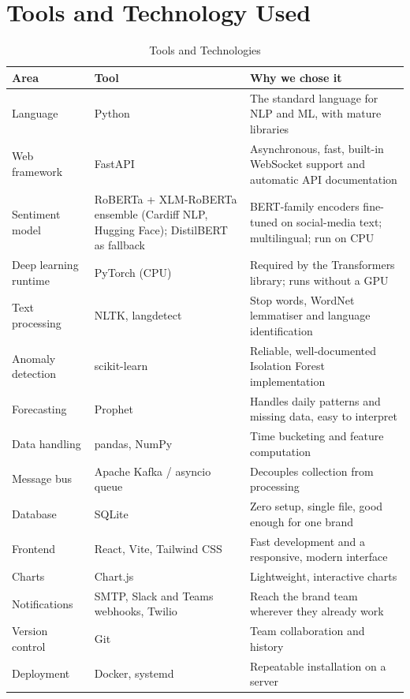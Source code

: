 \documentclass[12pt,a4paper]{report}
\newcommand{\cellpadding}{\renewcommand{\arraystretch}{1.2}}
\begin{document}
\section{Tools and Technology Used}

\begin{table}[H]
\centering
\cellpadding
\caption{Tools and Technologies}
\label{tab:tools}
\begin{tabular}{|P{3.4cm}|P{3.8cm}|P{6.6cm}|}
\hline
\textbf{Area} & \textbf{Tool} & \textbf{Why we chose it} \\
\hline
Language & Python & The standard language for NLP and ML, with mature libraries \\
\hline
Web framework & FastAPI & Asynchronous, fast, built-in WebSocket support and automatic API documentation \\
\hline
Sentiment model & RoBERTa + XLM-RoBERTa ensemble (Cardiff NLP, Hugging Face); DistilBERT as fallback & BERT-family encoders fine-tuned on social-media text; multilingual; run on CPU \\
\hline
Deep learning runtime & PyTorch (CPU) & Required by the Transformers library; runs without a GPU \\
\hline
Text processing & NLTK, langdetect & Stop words, WordNet lemmatiser and language identification \\
\hline
Anomaly detection & scikit-learn & Reliable, well-documented Isolation Forest implementation \\
\hline
Forecasting & Prophet & Handles daily patterns and missing data, easy to interpret \\
\hline
Data handling & pandas, NumPy & Time bucketing and feature computation \\
\hline
Message bus & Apache Kafka / asyncio queue & Decouples collection from processing \\
\hline
Database & SQLite & Zero setup, single file, good enough for one brand \\
\hline
Frontend & React, Vite, Tailwind CSS & Fast development and a responsive, modern interface \\
\hline
Charts & Chart.js & Lightweight, interactive charts \\
\hline
Notifications & SMTP, Slack and Teams webhooks, Twilio & Reach the brand team wherever they already work \\
\hline
Version control & Git & Team collaboration and history \\
\hline
Deployment & Docker, systemd & Repeatable installation on a server \\
\hline
\end{tabular}
\end{table}
\end{document}
